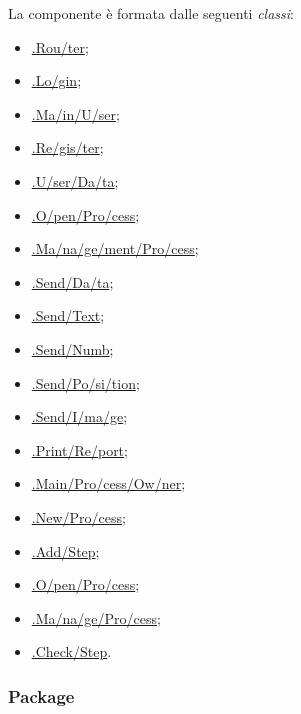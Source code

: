 La componente è formata dalle seguenti \textit{classi}:
\begin{itemize}
	\item \hyperref[router]{\logic{}.Rou\fshyp{}ter};
	\item \hyperref[login]{\logic{}.Lo\fshyp{}gin};
	\item \hyperref[mainUser]{\logicUser{}.Ma\fshyp{}in\fshyp{}U\fshyp{}ser};
	\item \hyperref[register]{\logicUser{}.Re\fshyp{}gis\fshyp{}ter};
	\item \hyperref[userData]{\logicUser{}.U\fshyp{}ser\fshyp{}Da\fshyp{}ta};
	\item \hyperref[openProcessU]{\logicUser{}.O\fshyp{}pen\fshyp{}Pro\fshyp{}cess};
	\item \hyperref[managementProcessU]{\logicUser{}.Ma\fshyp{}na\fshyp{}ge\fshyp{}ment\fshyp{}Pro\fshyp{}cess};
	\item \hyperref[sendData]{\logicUser{}.Send\fshyp{}Da\fshyp{}ta};
	\item \hyperref[sendText]{\logicUser{}.Send\fshyp{}Text};
	\item \hyperref[sendNumb]{\logicUser{}.Send\fshyp{}Numb};
	\item \hyperref[sendPosition]{\logicUser{}.Send\fshyp{}Po\fshyp{}si\fshyp{}tion};
	\item \hyperref[sendImage]{\logicUser{}.Send\fshyp{}I\fshyp{}ma\fshyp{}ge};
	\item \hyperref[printReport]{\logicUser{}.Print\fshyp{}Re\fshyp{}port};
	\item \hyperref[mainProcessOwner]{\logicAdmin{}.Main\fshyp{}Pro\fshyp{}cess\fshyp{}Ow\fshyp{}ner};
	\item \hyperref[newProcess]{\logicAdmin{}.New\fshyp{}Pro\fshyp{}cess};
	\item \hyperref[addStep]{\logicAdmin{}.Add\fshyp{}Step};
	\item \hyperref[openProcess]{\logicAdmin{}.O\fshyp{}pen\fshyp{}Pro\fshyp{}cess};
	\item \hyperref[manageProcess]{\logicAdmin{}.Ma\fshyp{}na\fshyp{}ge\fshyp{}Pro\fshyp{}cess};
	\item \hyperref[checkStep]{\logicAdmin{}.Check\fshyp{}Step}.
	
\end{itemize}


\subsubsection{Package \logic{}}

